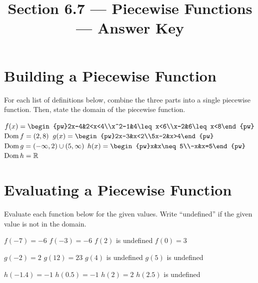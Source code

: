 

\title{Section 6.7 --- Piecewise Functions --- Answer Key}

\newcommand{\dpun}{,\ \mathrm{domain}\ }


\maketitle

\section*{Building a Piecewise Function}
For each list of definitions below, combine the three parts into a single piecewise function. Then, state the domain of the piecewise function.
\begin{smenum}
\mitemxx
{$f(x)=\begin{pw}%
2x-4&2<x<4\\%
x^2-1&4\leq x<6\\%
x-2&6\leq x<8\end{pw}$\\%
$\operatorname{Dom} f=\left(2,8\right)$}
{$g(x)=\begin{pw}%
2x-3&x<2\\%
5x-2&x>4\end{pw}$\\%
$\operatorname{Dom}{g}=\left(-\infty,2\right)\cup\left(5,\infty\right)$}
\mitemx
{$h(x)=\begin{pw}%
x&x\neq 5\\%
-x&x=5\end{pw}$\\$\operatorname{Dom} h=\mathbb{R}$}
\end{smenum}

\section*{Evaluating a Piecewise Function}
Evaluate each function below for the given values. Write ``undefined'' if the given value is not in the domain.
\begin{senum}
\item \begin{nmenum}
\mitemxxxx
{$f(-7)=-6$}
{$f(-3)=-6$}
{$f(2)$ is undefined}
{$f(0)=3$}
\end{nmenum}
\item \begin{nmenum}
\mitemxxxx
{$g(-2)=2$}
{$g(12)=23$}
{$g(4)$ is undefined}
{$g(5)$ is undefined}
\end{nmenum}
\item \begin{nmenum}
\mitemxxxx
{$h(-1.4)=-1$}
{$h(0.5)=-1$}
{$h(2)=2$}
{$h(2.5)$ is undefined}
\end{nmenum}
\end{senum}

